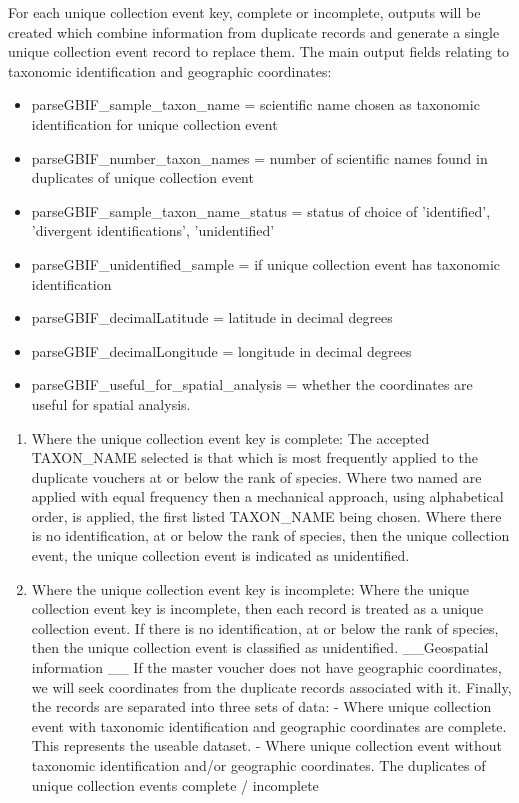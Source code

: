 \documentclass[a4paper]{book}
\begin{document}
\begin{Description}
For each unique collection event key, complete or incomplete,
outputs will be created which combine information from duplicate records and generate a
single unique collection event record to replace them.
The main output fields relating to taxonomic identification and geographic coordinates:
\begin{itemize}

\item{} parseGBIF\_sample\_taxon\_name = scientific name chosen as taxonomic identification for unique collection event
\item{} parseGBIF\_number\_taxon\_names = number of scientific names found in duplicates of unique collection event
\item{} parseGBIF\_sample\_taxon\_name\_status = status of choice of 'identified', 'divergent identifications', 'unidentified'
\item{} parseGBIF\_unidentified\_sample = if unique collection event has taxonomic identification
\item{} parseGBIF\_decimalLatitude = latitude in decimal degrees
\item{} parseGBIF\_decimalLongitude = longitude in decimal degrees
\item{} parseGBIF\_useful\_for\_spatial\_analysis = whether the coordinates are useful for spatial analysis.

\end{itemize}

\begin{enumerate}

\item{} Where the unique collection event key is complete:
The accepted TAXON\_NAME selected is that which is most frequently applied to the duplicate vouchers at or below the rank of species.
Where two named are applied with equal frequency then a mechanical approach, using alphabetical order, is applied, the first listed TAXON\_NAME being chosen.
Where there is no identification, at or below the rank of species, then the unique collection event, the unique collection event is indicated as unidentified.
\item{} Where the unique collection event key is incomplete:
Where the unique collection event key is incomplete, then each record is treated as a unique collection event. If there is no identification, at or below the rank of species, then the unique collection event is classified as unidentified.
\_\_Geospatial information \_\_
If the master voucher does not have geographic coordinates, we will seek coordinates from the duplicate records associated with it.
Finally, the records are separated into three sets of data:
 - Where unique collection event with taxonomic identification and geographic coordinates are complete. This represents the useable dataset.
  - Where unique collection event without taxonomic identification and/or geographic coordinates.
 The duplicates of unique collection events complete / incomplete


\end{enumerate}
\end{Description}
\end{document}
